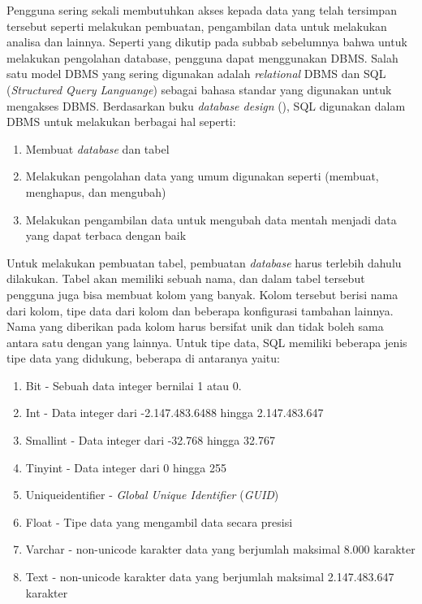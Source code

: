 Pengguna sering sekali membutuhkan akses kepada data yang telah tersimpan tersebut seperti melakukan pembuatan, pengambilan data untuk
melakukan analisa dan lainnya. Seperti yang dikutip pada subbab sebelumnya bahwa untuk melakukan pengolahan database, pengguna dapat menggunakan DBMS. Salah satu model DBMS yang
sering digunakan adalah \emph{relational} DBMS dan SQL (\emph{Structured Query Languange}) sebagai bahasa standar yang digunakan untuk mengakses DBMS. Berdasarkan buku \emph{database design} 
(\cite{databasedesignwatt}), SQL digunakan dalam DBMS untuk melakukan berbagai hal seperti:

\begin{enumerate}
	\item Membuat \emph{database} dan tabel

	\item Melakukan pengolahan data yang umum digunakan seperti (membuat, menghapus, dan mengubah)

  \item Melakukan pengambilan data untuk mengubah data mentah menjadi data yang dapat terbaca dengan baik
  
\end{enumerate}

Untuk melakukan pembuatan tabel, pembuatan \emph{database} harus terlebih dahulu dilakukan. Tabel akan memiliki sebuah nama, dan dalam tabel tersebut pengguna juga bisa membuat kolom yang banyak.
Kolom tersebut berisi nama dari kolom, tipe data dari kolom dan beberapa konfigurasi tambahan lainnya. Nama yang diberikan pada kolom harus bersifat unik dan tidak boleh sama antara satu
dengan yang lainnya. Untuk tipe data, SQL memiliki beberapa jenis tipe data yang didukung, beberapa di antaranya yaitu:

\begin{enumerate}
  \item Bit - Sebuah data integer bernilai 1 atau 0.

  \item Int - Data integer dari -2.147.483.6488 hingga 2.147.483.647

  \item Smallint - Data integer dari -32.768 hingga 32.767

  \item Tinyint - Data integer dari 0 hingga 255
  
  \item Uniqueidentifier - \emph{Global Unique Identifier} (\emph{GUID})
  
  \item Float - Tipe data yang mengambil data secara presisi

  \item Varchar - non-unicode karakter data yang berjumlah maksimal 8.000 karakter

  \item Text - non-unicode karakter data yang berjumlah maksimal 2.147.483.647 karakter
\end{enumerate}

